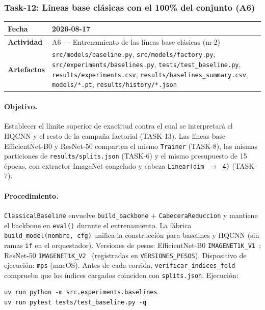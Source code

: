 
\subsubsection{Task-12: Líneas base clásicas con el 100\% del conjunto (A6)}
\label{hallazgo:task-12}
\begin{tabularx}{\textwidth}{|l|X|}\hline
\textbf{Fecha} & 2026-08-17 \\\hline
\textbf{Actividad} & A6 --- Entrenamiento de las líneas base clásicas (m-2) \\\hline
\textbf{Artefactos} & \texttt{src/models/baseline.py}, \texttt{src/models/factory.py}, \texttt{src/experiments/baselines.py}, \texttt{tests/test\_baseline.py}, \texttt{results/experiments.csv}, \texttt{results/baselines\_summary.csv}, \texttt{models/*.pt}, \texttt{results/history/*.json} \\\hline
\end{tabularx}

\paragraph{Objetivo.}
Establecer el límite superior de exactitud contra el cual se interpretará el HQCNN y el resto
de la campaña factorial (TASK-13). Las líneas base EfficientNet-B0 y ResNet-50 comparten el
mismo \texttt{Trainer} (TASK-8), las mismas particiones de \texttt{results/splits.json}
(TASK-6) y el mismo presupuesto de 15 épocas, con extractor ImageNet congelado y cabeza
\texttt{Linear(dim $\rightarrow$ 4)} (TASK-7).

\paragraph{Procedimiento.}
\texttt{ClassicalBaseline} envuelve \texttt{build\_backbone} + \texttt{CabeceraReduccion} y
mantiene el backbone en \texttt{eval()} durante el entrenamiento. La fábrica
\texttt{build\_model(nombre, cfg)} unifica la construcción para baselines y HQCNN (sin ramas
\texttt{if} en el orquestador). Versiones de pesos: EfficientNet-B0
\texttt{IMAGENET1K\_V1}~\cite{tan2019efficientnet}; ResNet-50 \texttt{IMAGENET1K\_V2}~\cite{he2016deep}
(registradas en \texttt{VERSIONES\_PESOS}). Dispositivo de ejecución: \texttt{mps} (macOS).
Antes de cada corrida, \texttt{verificar\_indices\_fold} comprueba que los índices cargados
coinciden con \texttt{splits.json}. Ejecución:
\begin{verbatim}
uv run python -m src.experiments.baselines
uv run pytest tests/test_baseline.py -q
\end{verbatim}

